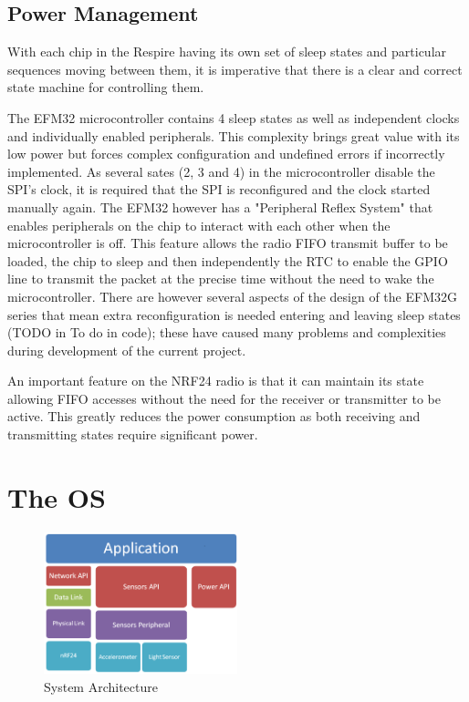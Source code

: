 \subsection{Power Management}
With each chip in the Respire having its own set of sleep states and particular sequences moving
between them, it is imperative that there is a clear and correct state machine for controlling them.


The EFM32 microcontroller contains 4 sleep states as well as independent clocks and individually
enabled peripherals. This complexity brings great value with its low power but forces complex
configuration and undefined errors if incorrectly implemented. As several sates (2, 3 and 4) in the
microcontroller disable the \ac{SPI}'s clock, it is required that the SPI is reconfigured and the clock started
manually again. The EFM32 however has a "Peripheral Reflex System" that enables peripherals on
the chip to interact with each other when the microcontroller is off. This feature allows the radio
\ac{FIFO} transmit buffer to be loaded, the chip to sleep and then independently the
\ac{RTC} to enable the \ac{GPIO} line to transmit the packet at the precise
time without the need to wake the microcontroller. There are however several aspects of the design
of the EFM32G series\cite{Energy Micro AS, 2012} that mean extra reconfiguration is needed entering
and leaving sleep states (TODO in To do in code); these have caused many problems and
complexities during development of the current project.


An important feature on the \ac{NRF24} radio is that it can maintain its state allowing \ac{FIFO} accesses
without the need for the receiver or transmitter to be active. This greatly reduces the power
consumption as both receiving and transmitting states require significant power.


\section{The \acf{OS}}

\begin{figure}
  \vspace{-10pt}
  \begin{center}
    \includegraphics[width=0.5\textwidth, keepaspectratio=true]{images/archatechture.png}
  \end{center}
  \caption[System Architecture]{System Architecture}
  \vspace{-10pt}
\end{figure}

